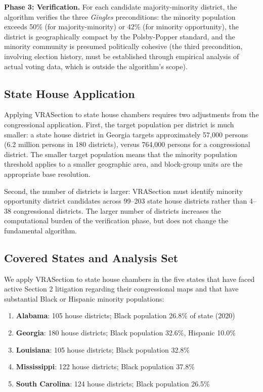 \textbf{Phase 3: Verification.} For each candidate majority-minority district, the algorithm verifies the three \textit{Gingles} preconditions: the minority population exceeds 50\% (for majority-minority) or 42\% (for minority opportunity), the district is geographically compact by the Polsby-Popper standard, and the minority community is presumed politically cohesive (the third precondition, involving election history, must be established through empirical analysis of actual voting data, which is outside the algorithm's scope).

\subsection{State House Application}

Applying VRASection to state house chambers requires two adjustments from the congressional application. First, the target population per district is much smaller: a state house district in Georgia targets approximately 57,000 persons (6.2 million persons in 180 districts), versus 764,000 persons for a congressional district. The smaller target population means that the minority population threshold applies to a smaller geographic area, and block-group units are the appropriate base resolution.

Second, the number of districts is larger: VRASection must identify minority opportunity district candidates across 99--203 state house districts rather than 4--38 congressional districts. The larger number of districts increases the computational burden of the verification phase, but does not change the fundamental algorithm.

\subsection{Covered States and Analysis Set}

We apply VRASection to state house chambers in the five states that have faced active Section 2 litigation regarding their congressional maps and that have substantial Black or Hispanic minority populations:

\begin{enumerate}
\item \textbf{Alabama}: 105 house districts; Black population 26.8\% of state (2020)
\item \textbf{Georgia}: 180 house districts; Black population 32.6\%, Hispanic 10.0\%
\item \textbf{Louisiana}: 105 house districts; Black population 32.8\%
\item \textbf{Mississippi}: 122 house districts; Black population 37.8\%
\item \textbf{South Carolina}: 124 house districts; Black population 26.5\%
\end{enumerate}

